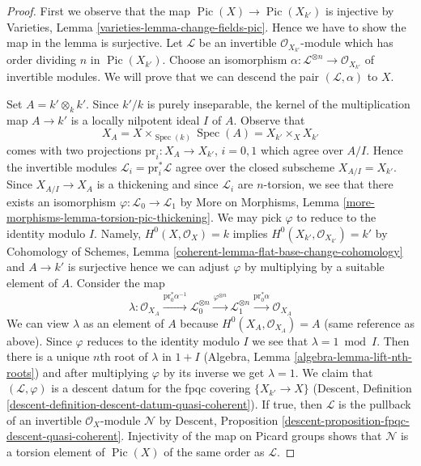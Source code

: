 \documentclass{stacks-project}
\theoremstyle{plain}
\theoremstyle{definition}
\theoremstyle{remark}
\numberwithin{equation}{subsection}
\def\Spec{\mathop{\mathrm{Spec}}}
\def\Pic{\mathop{\mathrm{Pic}}\nolimits}
\begin{document}
\begin{proof}
First we observe that the map $\Pic(X) \to \Pic(X_{k'})$
is injective by Varieties, Lemma \ref{varieties-lemma-change-fields-pic}.
Hence we have to show the map in the lemma is surjective.
Let $\mathcal{L}$ be an invertible $\mathcal{O}_{X_{k'}}$-module
which has order dividing $n$ in $\Pic(X_{k'})$.
Choose an isomorphism
$\alpha : \mathcal{L}^{\otimes n} \to \mathcal{O}_{X_{k'}}$
of invertible modules.
We will prove that we can descend the pair $(\mathcal{L}, \alpha)$
to $X$.

\medskip\noindent
Set $A = k' \otimes_k k'$. Since $k'/k$ is purely inseparable,
the kernel of the multiplication map $A \to k'$ is a
locally nilpotent ideal $I$ of $A$. Observe that
$$
X_A = X \times_{\Spec(k)} \Spec(A) = X_{k'} \times_X X_{k'}
$$
comes with two projections $\text{pr}_i : X_A \to X_{k'}$, $i = 0, 1$
which agree over $A/I$. Hence the invertible modules
$\mathcal{L}_i = \text{pr}_i^*\mathcal{L}$
agree over the closed subscheme $X_{A/I} = X_{k'}$.
Since $X_{A/I} \to X_A$ is a thickening and since
$\mathcal{L}_i$ are $n$-torsion, we see that there
exists an isomorphism $\varphi : \mathcal{L}_0 \to \mathcal{L}_1$ by
More on Morphisms, Lemma \ref{more-morphisms-lemma-torsion-pic-thickening}.
We may pick $\varphi$ to reduce to the identity modulo $I$. Namely,
$H^0(X, \mathcal{O}_X) = k$ implies
$H^0(X_{k'}, \mathcal{O}_{X_{k'}}) = k'$ by
Cohomology of Schemes, Lemma \ref{coherent-lemma-flat-base-change-cohomology}
and $A \to k'$ is surjective hence we can adjust $\varphi$ by multiplying by
a suitable element of $A$. Consider the map
$$
\lambda : \mathcal{O}_{X_A}
\xrightarrow{\text{pr}_0^*\alpha^{-1}}
\mathcal{L}_0^{\otimes n}
\xrightarrow{\varphi^{\otimes n}}
\mathcal{L}_1^{\otimes n}
\xrightarrow{\text{pr}_0^*\alpha}
\mathcal{O}_{X_A}
$$
We can view $\lambda$ as an element of $A$ because
$H^0(X_A, \mathcal{O}_{X_A}) = A$ (same reference as above).
Since $\varphi$ reduces to the identity modulo $I$ we
see that $\lambda = 1 \bmod I$. Then there is a unique
$n$th root of $\lambda$ in $1 + I$
(Algebra, Lemma \ref{algebra-lemma-lift-nth-roots})
and after multiplying $\varphi$ by its inverse we get $\lambda = 1$.
We claim that $(\mathcal{L}, \varphi)$ is a descent datum
for the fpqc covering $\{X_{k'} \to X\}$
(Descent, Definition \ref{descent-definition-descent-datum-quasi-coherent}).
If true, then $\mathcal{L}$ is the pullback of an invertible
$\mathcal{O}_X$-module $\mathcal{N}$ by
Descent, Proposition \ref{descent-proposition-fpqc-descent-quasi-coherent}.
Injectivity of the map on Picard groups shows that $\mathcal{N}$
is a torsion element of $\Pic(X)$ of the same order as $\mathcal{L}$.


\end{proof}
\end{document}
